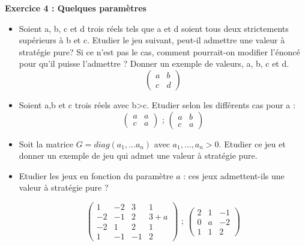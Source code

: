 \documentclass[12pt]{article}
\begin{document}
\begin{center}
\textbf{Exercice 4 : Quelques param\`etres}
\end{center}
\begin{itemize}
\item Soient a, b, c et d trois r\'eels tels que a et d soient tous deux strictements sup\'erieurs \`a b et c. 
Etudier le jeu suivant, peut-il admettre une valeur \`a strat\'egie pure? Si ce n'est pas le cas, comment pourrait-on modifier l'\'enonc\'e pour qu'il puisse l'admettre ? 
Donner un exemple de valeurs, a, b, c et d.
\begin{equation*}
\begin{pmatrix}
a&b\\
c&d
\end{pmatrix}
\end{equation*}
\item Soient a,b et c trois r\'eels avec b>c. Etudier selon les diff\'erents cas pour a :
\begin{equation*}
\begin{pmatrix}
a&a\\
c&a
\end{pmatrix}\text{ ; }
\begin{pmatrix}
a&b\\
c&a
\end{pmatrix}
\end{equation*}

\item Soit la matrice $G=diag(a_1,...a_n)$ avec $a_1,...,a_n>0$. Etudier ce jeu et donner un exemple de jeu qui admet une valeur \`a strat\'egie pure.

\item Etudier les jeux en fonction du param\`etre $a$ : ces jeux admettent-ils une valeur \`a strat\'egie pure ?

\begin{equation*}
\begin{pmatrix}
1&-2&3&1\\
-2&-1&2&3+a\\
-2&1&2&1\\
1&-1&-1&2
\end{pmatrix} \text{ ; }
\begin{pmatrix}
2&1&-1\\
0&a&-2\\
1&1&2
\end{pmatrix} 
\end{equation*}
\end{itemize}
\medskip
\medskip
\end{document}
